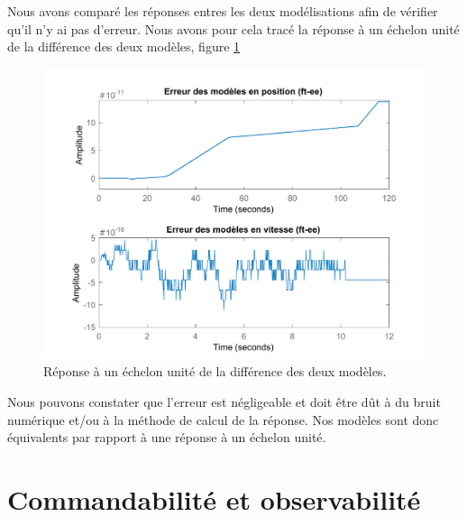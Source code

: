 Nous avons comparé les réponses entres les deux modélisations afin de vérifier qu'il n'y ai pas d'erreur. Nous avons pour cela tracé la réponse à un échelon unité de la différence des deux modèles, figure \ref{fig:errFT_EE}
\begin{figure}[!ht]
\centering
\includegraphics[width=.7\textwidth]{./I/images/erreurs_modeles_ft-ee.pdf}
\caption{\label{fig:errFT_EE} Réponse à un échelon unité de la différence des deux modèles.}
\end{figure}
Nous pouvons constater que l'erreur est négligeable et doit être dût à du bruit numérique et/ou à la méthode de calcul de la réponse. Nos modèles sont donc équivalents par rapport à une réponse à un échelon unité.
	\section{Commandabilité et observabilité}

